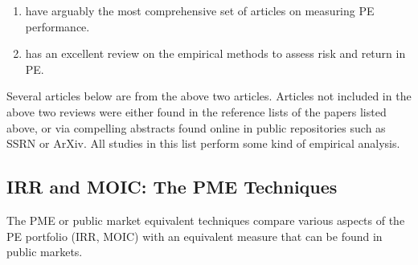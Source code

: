 \documentclass[final,5p,times,twocolumn,authoryear]{elsarticle}
\begin{document}
\begin{enumerate}[label=(\roman*)]
	\item \cite{Kaplan2015} have arguably the most comprehensive set of articles on measuring PE performance. 
	
	\item \cite{Korteweg2019} has an excellent review on the empirical methods to assess risk and return in PE.  
\end{enumerate}

Several articles below are from the above two articles. Articles not included in the above two reviews were either found in the reference lists of the papers listed above, or via compelling abstracts found online in public repositories such as SSRN or ArXiv. All studies in this list perform some kind of empirical analysis.

\subsection{IRR and MOIC: The PME Techniques}

The PME or public market equivalent techniques compare various aspects of the PE portfolio (IRR, MOIC) with an equivalent measure that can be found in public markets.
\end{document}
